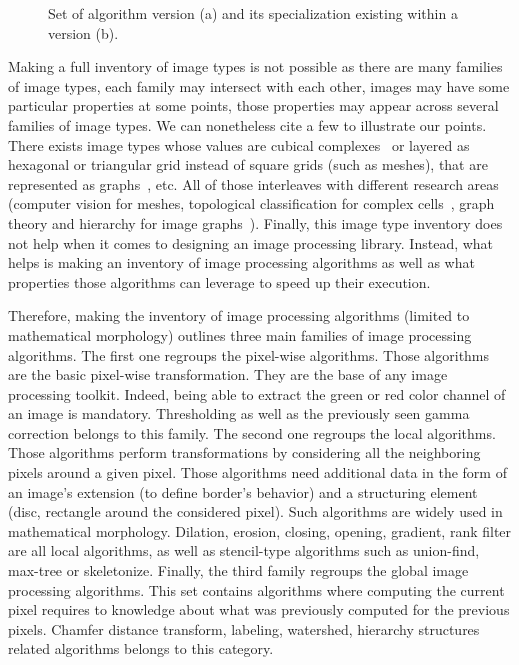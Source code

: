 \begin{figure}[htbp]
  \centering
  \hfil
  \caption{Set of algorithm version (a) and its specialization existing within a version (b).}
  \label{fig:image.version.vs.specialization}
\end{figure}

Making a full inventory of image types is not possible as there are many families of image types, each family may
intersect with each other, images may have some particular properties at some points, those properties may appear across
several families of image types. We can nonetheless cite a few to illustrate our points. There exists image types whose
values are cubical complexes~\parencite{ziou.2002.cubical-complex} or layered as hexagonal or triangular grid instead of
square grids (such as meshes), that are represented as graphs~\parencite{meyer.2009.ismm}, etc. All of those interleaves
with different research areas (computer vision for meshes, topological classification for complex
cells~\parencite{movn.20.cviu,allili.2001.cubical}, graph theory and hierarchy for image
graphs~\parencite{carlinet.2014.tip,carlinet.2015.tip,perret.2019.higra}). Finally, this image type inventory does not
help when it comes to designing an image processing library. Instead, what helps is making an inventory of image
processing algorithms as well as what properties those algorithms can leverage to speed up their execution.

Therefore, making the inventory of image processing algorithms (limited to mathematical morphology) outlines three main
families of image processing algorithms. The first one regroups the pixel-wise algorithms. Those algorithms are the
basic pixel-wise transformation. They are the base of any image processing toolkit. Indeed, being able to extract the
green or red color channel of an image is mandatory. Thresholding as well as the previously seen gamma correction
belongs to this family. The second one regroups the local algorithms. Those algorithms perform transformations by
considering all the neighboring pixels around a given pixel. Those algorithms need additional data in the form of an
image's extension (to define border's behavior) and a structuring element (disc, rectangle around the considered pixel).
Such algorithms are widely used in mathematical morphology. Dilation, erosion, closing, opening, gradient, rank filter
are all local algorithms, as well as stencil-type algorithms such as union-find, max-tree or skeletonize. Finally, the
third family regroups the global image processing algorithms. This set contains algorithms where computing the current
pixel requires to knowledge about what was previously computed for the previous pixels. Chamfer distance transform,
labeling, watershed, hierarchy structures related algorithms belongs to this category.


